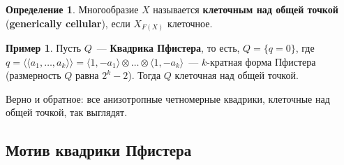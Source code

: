 \documentclass[a4paper]{article}
\newcommand{\term}{\textbf}
\theoremstyle{definition}
\newtheorem{example}[theorem]{Пример}
\newtheorem{definition}[theorem]{Определение}
\newcommand{\la}{\langle}
\newcommand{\ra}{\rangle}
\newcommand{\lAngle}{\langle\!\langle}
\newcommand{\rAngle}{\rangle\!\rangle}
\begin{document}
\begin{definition}
Многообразие $X$ называется \term{клеточным над общей точкой}
(\term{generically cellular}), если $X_{F(X)}$ клеточное.
\end{definition}
\begin{example}
Пусть $Q$~--- \term{Квадрика Пфистера}, то есть, $Q = \{q=0\}$,
где $q = \lAngle a_1,\dots,a_k\rAngle = \la 1,-a_1\ra \otimes\dots
\otimes\la 1,-a_k\ra$~--- $k$-кратная форма Пфистера
(размерность $Q$ равна $2^k-2$).
Тогда $Q$ клеточная над общей точкой.
\end{example}
Верно и обратное: все анизотропные четномерные квадрики,
клеточные над общей точкой, так выглядят.

\subsection{Мотив квадрики Пфистера}
\end{document}
